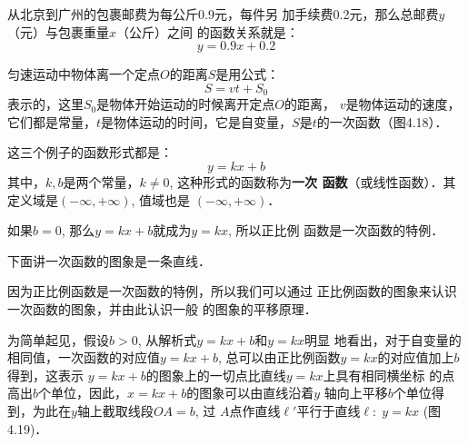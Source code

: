\begin{example}
    从北京到广州的包裹邮费为每公斤0.9元，每件另
加手续费0.2元，那么总邮费$y$（元）与包裹重量$x$（公斤）之间
的函数关系就是：
\begin{equation}
  y=0.9x+0.2  
\end{equation}
\end{example}


\begin{example}
    匀速运动中物体离一个定点$O$的距离$S$是用公式：
\[S=vt+S_0\]
表示的，这里$S_0$是物体开始运动的时候离开定点$O$的距离，
$v$是物体运动的速度，它们都是常量，$t$是物体运动的时间，它是自变量，$S$是$t$的一次函数（图4.18）．
\begin{figure}[htp]
    \begin{center}
    \end{center}
    \caption{}
\end{figure}
\end{example}

这三个例子的函数形式都是：
\[y=kx+b\]
其中，$k,b$是两个常量，$k\ne 0$, 这种形式的函数称为\textbf{一次
函数}（或线性函数）．其定义域是$(-\infty,+\infty)$, 值域也是
$(-\infty,+\infty)$．

如果$b=0$, 那么$y=kx+b$就成为$y=kx$, 所以正比例
函数是一次函数的特例．

下面讲一次函数的图象是一条直线．

因为正比例函数是一次函数的特例，所以我们可以通过
正比例函数的图象来认识一次函数的图象，并由此认识一般
的图象的平移原理．

为简单起见，假设$b>0$, 从解析式$y=kx+b$和$y=kx$明显
地看出，对于自变量的相同值，一次函数的对应值$y=kx+b$,
总可以由正比例函数$y=kx$的对应值加上$b$得到，这表示
$y=kx+b$的图象上的一切点比直线$y=kx$上具有相同横坐标
的点高出$b$个单位，因此，$x=kx+b$的图象可以由直线沿着$y$
轴向上平移$b$个单位得到，为此在$y$轴上截取线段$OA=b$, 过
$A$点作直线$\ell'$平行于直线$\ell:\; y=kx$ (图4.19)．

